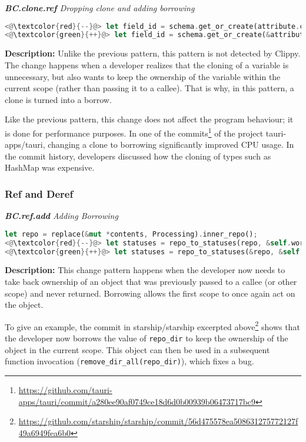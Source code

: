 \noindent\textit{\textbf{BC.clone.ref} Dropping clone and adding borrowing}

\begin{lstlisting}[language=Rust, style=colouredRust]
<@\textcolor{red}{--}@> let field_id = schema.get_or_create(attribute.clone())?;
<@\textcolor{green}{++}@> let field_id = schema.get_or_create(&attribute)?;
\end{lstlisting}

\noindent\textbf{Description:} Unlike the previous pattern, this pattern is not detected by Clippy. The change happens when a developer realizes that the cloning of a variable is unnecessary, but also wants to keep the ownership of the variable within the current scope (rather than passing it to a callee). That is why, in this pattern, a clone is turned into a borrow. 

Like the previous pattern, this change does not affect the program behaviour; it is done for performance purposes. In one of the commits\footnote{\scriptsize \url{https://github.com/tauri-apps/tauri/commit/a280ee90af0749ce18d6d0b00939b06473717bc9}} of the project tauri-apps/tauri, changing a clone to borrowing significantly improved CPU usage. In the commit history, developers discussed how the cloning of types such as HashMap was expensive. \\

\subsubsection{Ref and Deref}

\noindent\textit{\textbf{BC.ref.add} Adding Borrowing}

\begin{lstlisting}[language=Rust, style=colouredRust]
let repo = replace(&mut *contents, Processing).inner_repo();
<@\textcolor{red}{--}@> let statuses = repo_to_statuses(repo, &self.workdir);
<@\textcolor{green}{++}@> let statuses = repo_to_statuses(&repo, &self.workdir);
\end{lstlisting}

\noindent\textbf{Description:} This change pattern happens when the developer now needs to take back ownership of an object that was previously passed to a callee (or other scope) and never returned. Borrowing allows the first scope to once again act on the object.

To give an example, the commit in starship/starship excerpted above\footnote{\scriptsize \url{https://github.com/starship/starship/commit/56d475578ea508631275772127f49a6949fea6b0}} shows that the developer now borrows the value of \verb+repo_dir+ to keep the ownership of the object in the current scope. This object can then be used in a subsequent function invocation (\verb+remove_dir_all(repo_dir)+), which fixes a bug. \\

